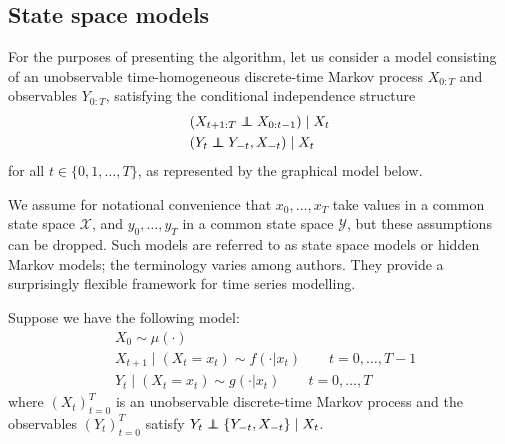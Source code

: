 \documentclass[fleqn]{article}
\theoremstyle{definition}
\newcommand\indep{\protect\mathpalette{\protect\independenT}{\perp}}
\def\independenT#1#2{\mathrel{\rlap{$#1#2$}\mkern2mu{#1#2}}}
\begin{document}
\subsection{State space models}\label{sec:SSM_spec}
For the purposes of presenting the algorithm, let us consider a model consisting of an unobservable time-homogeneous discrete-time Markov process $X_{0:T}$ and observables $Y_{0:T}$, satisfying the conditional independence structure
\begin{align*}
& (X_{t+1:T} \indep X_{0:t-1}) \mid X_t \\
& (Y_t \indep Y_{-t}, X_{-t}) \mid X_t
\end{align*}
for all $t \in \{0,1,\dots, T\}$, as represented by the graphical model below.

\begin{center}
\end{center}

We assume for notational convenience that $x_0,\dots,x_T$ take values in a common state space $\mathcal{X}$, and $y_0,\dots,y_T$ in a common state space $\mathcal{Y}$, but these assumptions can be dropped. 
Such models are referred to as {state space models} or {hidden Markov models}; the terminology varies among authors. They provide a surprisingly flexible framework for time series modelling.

Suppose we have the following model:
\begin{align*}
& X_0 \sim \mu(\cdot) \\
& X_{t+1} \mid (X_t = x_t) \sim f(\cdot | x_t)  \qquad t=0,\dots,T-1 \\
& Y_t \mid (X_t = x_t) \sim g(\cdot | x_t) \qquad t=0,\dots,T
\end{align*}
where $(X_t)_{t=0}^T$ is an unobservable discrete-time Markov process and the observables $(Y_t)_{t=0}^T$ satisfy $Y_t \indep \{Y_{-t}, X_{-t}\} \mid X_t$. 
\end{document}
